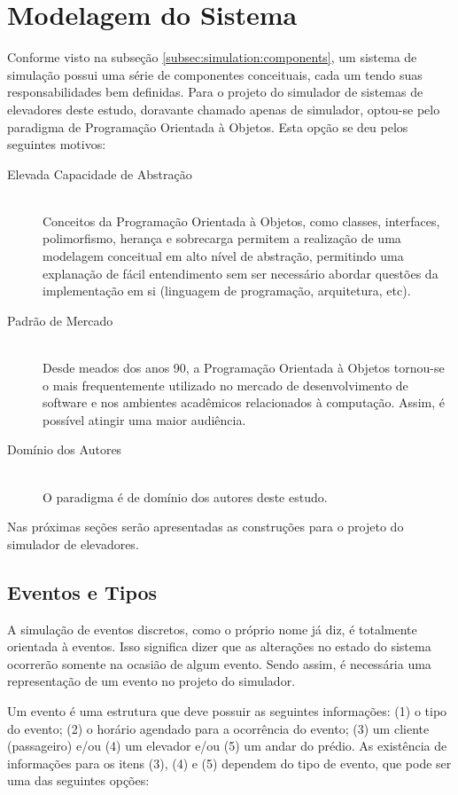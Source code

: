 \chapter{\label{chap:modeling}Modelagem do Sistema}

Conforme visto na subseção \ref{subsec:simulation:components}, um sistema de
simulação possui uma série de componentes conceituais, cada um tendo suas
responsabilidades bem definidas. Para o projeto do simulador de sistemas de
elevadores deste estudo, doravante chamado apenas de simulador, optou-se pelo
paradigma de Programação Orientada à Objetos. Esta opção se deu pelos seguintes
motivos:

\begin{description}
  \item[Elevada Capacidade de Abstração]\hfill \\
    Conceitos da Programação Orientada à Objetos, como classes, interfaces,
    polimorfismo, herança e sobrecarga permitem a realização de uma modelagem
    conceitual em alto nível de abstração, permitindo uma explanação de fácil
    entendimento sem ser necessário abordar questões da implementação em si
    (linguagem de programação, arquitetura, etc).
  \item[Padrão de Mercado]\hfill \\
    Desde meados dos anos 90, a Programação Orientada à Objetos tornou-se o mais
    frequentemente utilizado no mercado de desenvolvimento de software e nos
    ambientes acadêmicos relacionados à computação. Assim, é possível atingir
    uma maior audiência.
  \item[Domínio dos Autores]\hfill \\
    O paradigma é de domínio dos autores deste estudo.
\end{description}

Nas próximas seções serão apresentadas as construções para o projeto do
simulador de elevadores.

\section{Eventos e Tipos}

A simulação de eventos discretos, como o próprio nome já diz, é totalmente
orientada à eventos. Isso significa dizer que as alterações no estado do sistema
ocorrerão somente na ocasião de algum evento. Sendo assim, é necessária uma
representação de um evento no projeto do simulador.

Um evento é uma estrutura que deve possuir as seguintes informações: (1) o tipo
do evento; (2) o horário agendado para a ocorrência do evento; (3) um cliente
(passageiro) e/ou (4) um elevador e/ou (5) um andar do prédio. As existência de
informações para os itens (3), (4) e (5) dependem do tipo de evento, que pode
ser uma das seguintes opções:

